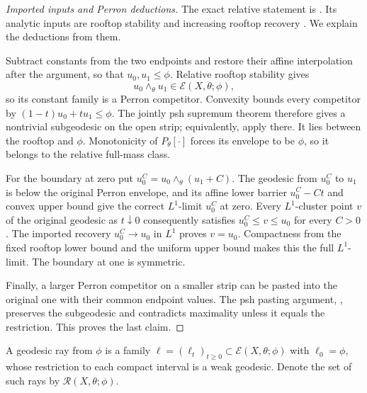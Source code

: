 \begin{proof}[Imported inputs and Perron deductions]
The exact relative statement is \cite[Proposition~4.2.1]{XiaBook}.
Its analytic inputs are rooftop stability
\cite[Proposition~3.1.21]{XiaBook} and increasing rooftop recovery
\cite[Proposition~3.1.24]{XiaBook}.  We explain the deductions from them.

Subtract constants from the two endpoints and restore their affine
interpolation after the argument, so that $u_0,u_1\leq\phi$.
Relative rooftop stability gives
\[
                    u_0\wedge_\theta u_1\in
                    \mathcal E(X,\theta;\phi),
\]
so its constant family is a Perron competitor.  Convexity bounds every
competitor by $(1-t)u_0+tu_1\leq\phi$.  The jointly psh supremum theorem
therefore gives a nontrivial subgeodesic on the open strip; equivalently,
apply \cite[Proposition~4.1.3]{XiaBook} there.  It lies between the rooftop
and $\phi$.  Monotonicity of $P_\theta[\cdot]$ forces its envelope to be
$\phi$, so it belongs to the relative full-mass class.

For the boundary at zero put $u_0^C=u_0\wedge_\theta(u_1+C)$.
The geodesic from $u_0^C$ to $u_1$ is below the original Perron envelope,
and its affine lower barrier $u_0^C-Ct$ and convex upper bound give the
correct $L^1$-limit $u_0^C$ at zero.  Every $L^1$-cluster point $v$ of
the original geodesic as $t\downarrow0$ consequently satisfies
$u_0^C\leq v\leq u_0$ for every $C>0$.  The imported recovery
$u_0^C\to u_0$ in $L^1$ proves $v=u_0$.  Compactness from the fixed
rooftop lower bound and the uniform upper bound makes this the full
$L^1$-limit.  The boundary at one is symmetric.

Finally, a larger Perron competitor on a smaller strip can be pasted
into the original one with their common endpoint values.  The psh
pasting argument, \cite[Proposition~4.1.4 and the proof of
Proposition~4.2.1]{XiaBook}, preserves the subgeodesic and contradicts
maximality unless it equals the restriction.  This proves the last claim.
\end{proof}

\begin{definition}
\label{def:rays-geodesic-ray}
A geodesic ray from $\phi$ is a family
$\ell=(\ell_t)_{t\geq0}\subset\mathcal E(X,\theta;\phi)$ with
$\ell_0=\phi$, whose restriction to each compact interval is a weak
geodesic.  Denote the set of such rays by
$\mathcal R(X,\theta;\phi)$.
\end{definition}

